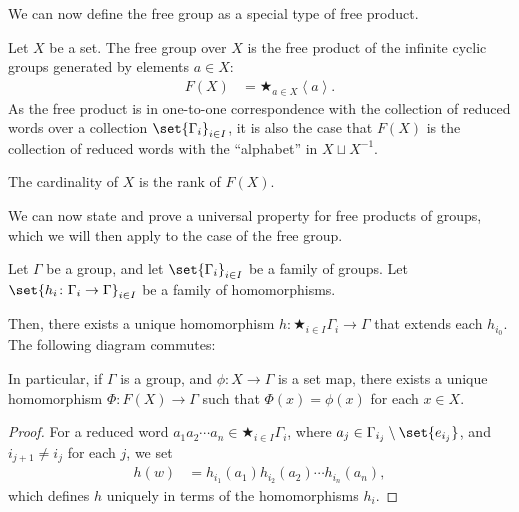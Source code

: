We can now define the free group as a special type of free product.
\begin{definition}
  Let $X$ be a set. The {free group} over $X$ is the free product of the infinite cyclic groups generated by elements $a\in X$:
  \begin{align*}
    F(X) &= \bigstar_{a\in X}\left\langle a \right\rangle.
  \end{align*}
  As the free product is in one-to-one correspondence with the collection of reduced words over a collection $\set{\Gamma_i}_{i\in I}$, it is also the case that $F(X)$ is the collection of reduced words with the ``alphabet'' in $X\sqcup X^{-1}$.\newline

  The cardinality of $X$ is the rank of $F(X)$.\label{def:free_group_as_product}
\end{definition}
We can now state and prove a universal property for free products of groups, which we will then apply to the case of the free group.
\begin{theorem}
  Let $\Gamma$ be a group, and let $\set{\Gamma_{i}}_{i\in I}$ be a family of groups. Let $\set{h_i\colon \Gamma_i\rightarrow \Gamma}_{i\in I}$ be a family of homomorphisms.\newline

  Then, there exists a unique homomorphism $h\colon \bigstar_{i\in I}\Gamma_i \rightarrow \Gamma$ that extends each $h_{i_{0}}$. The following diagram commutes:
  \begin{center}
  \end{center}
  In particular, if $\Gamma$ is a group, and $\phi\colon X\rightarrow \Gamma$ is a set map, there exists a unique homomorphism $\Phi\colon F(X)\rightarrow \Gamma$ such that $\Phi(x) = \phi(x)$ for each $x\in X$.
\end{theorem}
\begin{proof}
  For a reduced word $a_1a_2\cdots a_n\in \bigstar_{i\in I}\Gamma_i$, where $a_j\in \Gamma_{i_j}\setminus \set{e_{i_j}}$, and $i_{j+1} \neq i_j$ for each $j$, we set
  \begin{align*}
    h\left(w\right) &= h_{i_1}\left(a_1\right)h_{i_2}\left(a_2\right)\cdots h_{i_n}\left(a_n\right),
  \end{align*}
  which defines $h$ uniquely in terms of the homomorphisms $h_{i}$.
\end{proof}
